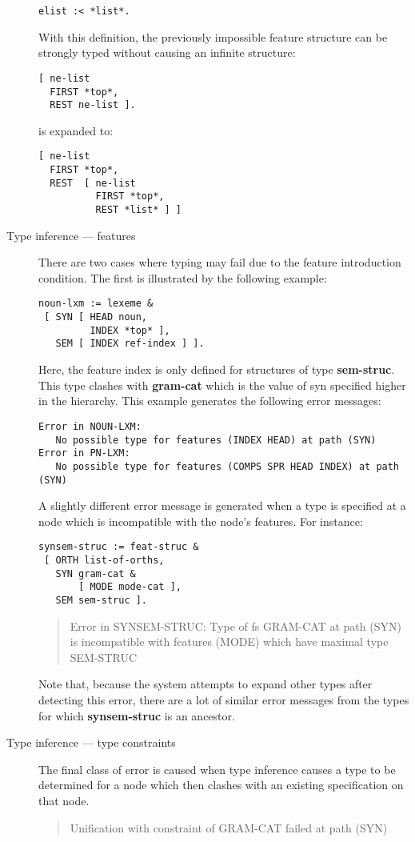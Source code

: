 \documentclass[12pt]{report}
\newenvironment{error}%
{\begin{quote}
\tt
}%
{\end{quote}
}
\begin{document}
\begin{description}
\begin{verbatim}
elist :< *list*.
\end{verbatim}
With this definition, the previously impossible feature structure 
can be strongly typed without causing an infinite structure:
\begin{verbatim}
[ ne-list 
  FIRST *top*,
  REST ne-list ].
\end{verbatim}
is expanded to:
\begin{verbatim}
[ ne-list 
  FIRST *top*,
  REST  [ ne-list
          FIRST *top*,
          REST *list* ] ]
\end{verbatim}
\item[Type inference --- features]
There are two cases where typing may fail due to
the feature introduction condition.  The first is illustrated
by the following example:
\begin{verbatim}
noun-lxm := lexeme &
 [ SYN [ HEAD noun,
         INDEX *top* ],
   SEM [ INDEX ref-index ] ].
\end{verbatim}
Here, the feature {\sc index} is only defined for structures of type
{\bf sem-struc}.  This type clashes with {\bf gram-cat} which is
the value of {\sc syn} specified
higher in the hierarchy.
This example generates the following error messages:
\begin{verbatim}
Error in NOUN-LXM:
   No possible type for features (INDEX HEAD) at path (SYN)
Error in PN-LXM:
   No possible type for features (COMPS SPR HEAD INDEX) at path (SYN)
\end{verbatim}

A slightly different error message
is generated when a type is specified at a node which is incompatible
with the node's features.  For instance:
\begin{verbatim}
synsem-struc := feat-struc &
 [ ORTH list-of-orths,
   SYN gram-cat & 
       [ MODE mode-cat ],
   SEM sem-struc ].
\end{verbatim}
\begin{error}
Error in SYNSEM-STRUC:
  Type of fs GRAM-CAT at path (SYN) is incompatible with features (MODE) which have maximal type SEM-STRUC
\end{error}
Note that, because the system attempts to expand other
types after detecting this error,
there are a lot of similar error messages from the types for which
{\bf synsem-struc} is an ancestor.

\item[Type inference --- type constraints]
The final class of error is caused when type inference causes a
type to be determined for a node which then clashes with an existing
specification on that node.  
\begin{error}
Unification with constraint of GRAM-CAT failed at path (SYN)
\end{error}
\end{description}
\end{document}
